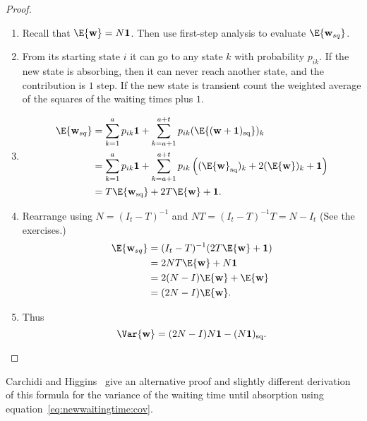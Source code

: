 \documentclass[12pt]{article}
\begin{document}
\begin{proof}
  \begin{enumerate}
  \item 
  Recall that \( \E{\mathbf{w}} = N \mathbf{1} \).
  Then use first-step analysis to evaluate \( \E{\mathbf{w}_{sq}} \).
\item 
  From its starting state \( i \) it can go to any state \( k \) with
  probability $p_{ik}$.  If the new state is absorbing, then it can
  never reach another state, and the contribution is \( 1 \) step.  If
  the new state is transient count the weighted average of the squares
  of the waiting times plus \(1 \).
\item 
\begin{align*}
     \E{\mathbf{w}_{sq}} &=
     \sum\limits_{k=1}^{a} p_{ik} \mathbf{1} +
                         \sum\limits_{k=a+1}^{a+t} p_{ik}
                         (\E{(\mathbf{w}+\mathbf{1})_{\text{sq}} })_k \\
                         &= \sum\limits_{k=1}^{a} p_{ik} \mathbf{1} +
                           \sum\limits_{k=a+1}^{a+t} p_{ik}
                           \left( (\E{ \mathbf{w}}_{\text{sq}})_k + 2
       (\E{ \mathbf{w}})_k + \mathbf{1} \right) \\
     &= T \E{\mathbf{w}_{\text{sq}}} + 2 T\E{\mathbf{w}} + \mathbf{1}.
\end{align*}
\item 
   Rearrange using \( N = (I_t - T)^{-1} \) and \( NT =
   (I_t - T)^{-1} T = N - I_t \) (See the exercises.) 
\begin{align*}
     \E{\mathbf{w}_{sq}} &= (I_t - T)^{-1} (2 T\E{\mathbf{w}} +
                           \mathbf{1}) \\
                        &= 2NT \E{\mathbf{w}} + N \mathbf{1} \\
                        &= 2(N-I) \E{\mathbf{w}} + \E{\mathbf{w}} \\
                        &= (2N-I) \E{\mathbf{w}}.
\end{align*}
\item 
Thus
\[
  \Var{\mathbf{w}} = (2N - I)N\mathbf{1} -
     (N\mathbf{1})_{\text{sq}}.
\]
  \end{enumerate}
\end{proof}

\begin{remark}
  Carchidi and Higgins~\cite{carchidi17} give an alternative proof and slightly
  different derivation of this formula for the variance of the waiting
  time until absorption using equation~\eqref{eq:newwaitingtime:cov}.
\end{remark}
\end{document}
